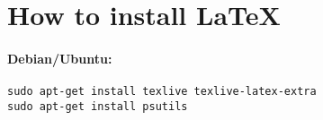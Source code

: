 \chapter{How to install \LaTeX} 

\subsubsection*{Debian/Ubuntu:}
\begin{verbatim} 
sudo apt-get install texlive texlive-latex-extra 
sudo apt-get install psutils
\end{verbatim}
